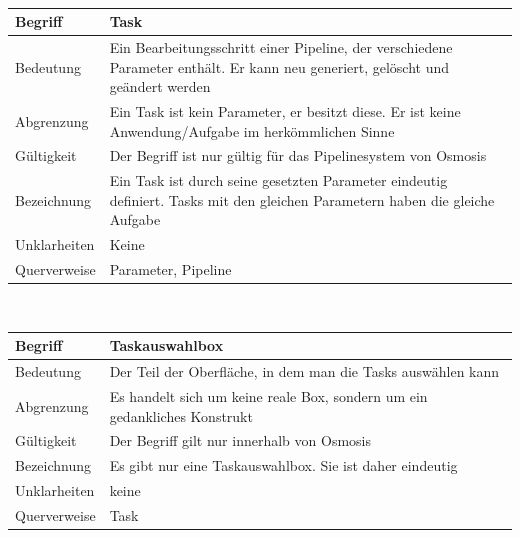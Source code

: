 \documentclass[a4paper,10pt]{scrartcl}
\begin{document}
\\
\begin{tabular}{|p{5cm}|p{10cm}|}
\hline Begriff & \textbf{Task} \\ 
\hline Bedeutung & Ein Bearbeitungsschritt einer Pipeline, der verschiedene Parameter enthält. Er kann neu generiert, gelöscht und geändert werden\\ 
\hline Abgrenzung & Ein Task ist kein Parameter, er besitzt diese. Er ist keine Anwendung/Aufgabe im herkömmlichen Sinne \\ 
\hline Gültigkeit & Der Begriff ist nur gültig für das Pipelinesystem von Osmosis\\ 
\hline Bezeichnung & Ein Task ist durch seine gesetzten Parameter eindeutig definiert. Tasks mit den gleichen Parametern haben die gleiche Aufgabe\\ 
\hline Unklarheiten & Keine \\ 
\hline Querverweise & Parameter, Pipeline\\ 
\hline 
\end{tabular}
\\
\begin{tabular}{|p{5cm}|p{10cm}|}
\hline Begriff & \textbf{Taskauswahlbox} \\ 
\hline Bedeutung & Der Teil der Oberfläche, in dem man die Tasks auswählen kann  \\ 
\hline Abgrenzung & Es handelt sich um keine reale Box, sondern um ein gedankliches Konstrukt \\ 
\hline Gültigkeit & Der Begriff gilt nur innerhalb von Osmosis \\ 
\hline Bezeichnung & Es gibt nur eine Taskauswahlbox. Sie ist daher eindeutig \\ 
\hline Unklarheiten & keine \\ 
\hline Querverweise & Task \\ 
\hline 
\end{tabular}
\end{document}
